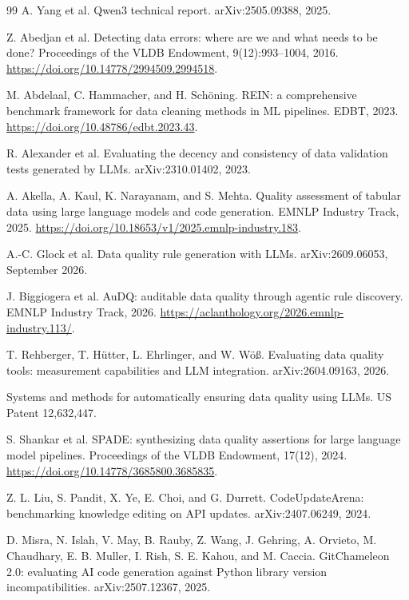 \documentclass[11pt,a4paper]{article}
\begin{document}
\begin{thebibliography}{99}
 A. Yang et al. Qwen3 technical report. arXiv:2505.09388, 2025.

 Z. Abedjan et al. Detecting data errors: where are we and what needs to be done? Proceedings of the VLDB Endowment, 9(12):993--1004, 2016. \url{https://doi.org/10.14778/2994509.2994518}.

 M. Abdelaal, C. Hammacher, and H. Sch\"oning. REIN: a comprehensive benchmark framework for data cleaning methods in ML pipelines. EDBT, 2023. \url{https://doi.org/10.48786/edbt.2023.43}.

 R. Alexander et al. Evaluating the decency and consistency of data validation tests generated by LLMs. arXiv:2310.01402, 2023.

 A. Akella, A. Kaul, K. Narayanam, and S. Mehta. Quality assessment of tabular data using large language models and code generation. EMNLP Industry Track, 2025. \url{https://doi.org/10.18653/v1/2025.emnlp-industry.183}.

 A.-C. Glock et al. Data quality rule generation with LLMs. arXiv:2609.06053, September 2026.

 J. Biggiogera et al. AuDQ: auditable data quality through agentic rule discovery. EMNLP Industry Track, 2026. \url{https://aclanthology.org/2026.emnlp-industry.113/}.

 T. Rehberger, T. H\"utter, L. Ehrlinger, and W. W\"o{\ss}. Evaluating data quality tools: measurement capabilities and LLM integration. arXiv:2604.09163, 2026.

 Systems and methods for automatically ensuring data quality using LLMs. US Patent 12,632,447.

 S. Shankar et al. SPADE: synthesizing data quality assertions for large language model pipelines. Proceedings of the VLDB Endowment, 17(12), 2024. \url{https://doi.org/10.14778/3685800.3685835}.

 Z. L. Liu, S. Pandit, X. Ye, E. Choi, and G. Durrett. CodeUpdateArena: benchmarking knowledge editing on API updates. arXiv:2407.06249, 2024.

 D. Misra, N. Islah, V. May, B. Rauby, Z. Wang, J. Gehring, A. Orvieto, M. Chaudhary, E. B. Muller, I. Rish, S. E. Kahou, and M. Caccia. GitChameleon 2.0: evaluating AI code generation against Python library version incompatibilities. arXiv:2507.12367, 2025.


\end{thebibliography}
\end{document}
